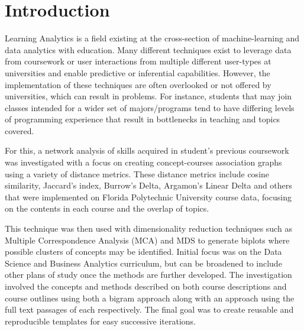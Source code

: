 %
%
%

\chapter{Introduction}
\label{introduction}



\hspace*{0.5cm} Learning Analytics is a field existing at the cross-section of machine-learning and data analytics with education. 
Many different techniques exist to leverage data from coursework or user interactions from multiple different user-types at universities and enable predictive 
or inferential capabilities. However, the implementation of these techniques are often overlooked or not offered by universities, which can result in problems. 
For instance, students that may join classes intended for a wider set of majors/programs tend to have differing levels of programming experience that result in bottlenecks in teaching and topics covered. 

For this, a network analysis of skills acquired in student’s previous coursework was investigated with a focus on creating concept-courses association graphs using 
a variety of distance metrics.  These distance metrics include cosine similarity,  Jaccard's index, Burrow's Delta, Argamon's Linear Delta and others \cite{lan_tag-aware_2014} 
\cite{lan_sparse_nodate}  that were implemented on Florida Polytechnic University course data, focusing on the contents in each course and the overlap of topics. 

\indent This technique was then used with dimensionality reduction techniques such as Multiple Correspondence Analysis (MCA) and MDS to generate biplots where 
possible clusters of concepts may be identified.  Initial focus was on the Data Science and Business Analytics curriculum, but can be broadened to include other plans of 
study once the methods are further developed. The investigation involved the concepts and methods described on both course descriptions and course outlines using both a 
bigram approach along with an approach using the full text passages of each respectively.  The final goal was to create reusable and reproducible templates for easy successive 
iterations. 
